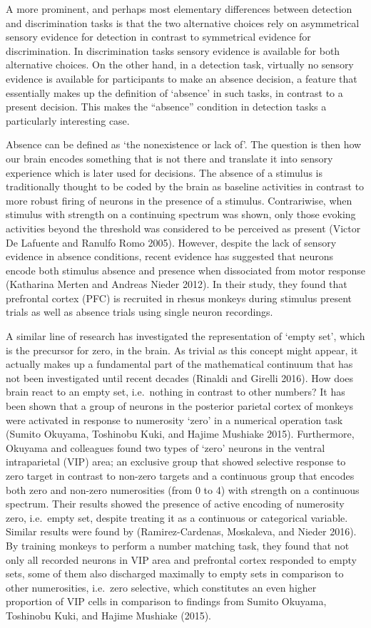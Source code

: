 \documentclass[
]{article}
\begin{document}
A more prominent, and perhaps most elementary differences between
detection and discrimination tasks is that the two alternative choices
rely on asymmetrical sensory evidence for detection in contrast to
symmetrical evidence for discrimination. In discrimination tasks sensory
evidence is available for both alternative choices. On the other hand,
in a detection task, virtually no sensory evidence is available for
participants to make an absence decision, a feature that essentially
makes up the definition of `absence' in such tasks, in contrast to a
present decision. This makes the ``absence'' condition in detection
tasks a particularly interesting case.

Absence can be defined as `the nonexistence or lack of'. The question is
then how our brain encodes something that is not there and translate it
into sensory experience which is later used for decisions. The absence
of a stimulus is traditionally thought to be coded by the brain as
baseline activities in contrast to more robust firing of neurons in the
presence of a stimulus. Contrariwise, when stimulus with strength on a
continuing spectrum was shown, only those evoking activities beyond the
threshold was considered to be perceived as present (Victor De Lafuente
and Ranulfo Romo 2005). However, despite the lack of sensory evidence in
absence conditions, recent evidence has suggested that neurons encode
both stimulus absence and presence when dissociated from motor response
(Katharina Merten and Andreas Nieder 2012). In their study, they found
that prefrontal cortex (PFC) is recruited in rhesus monkeys during
stimulus present trials as well as absence trials using single neuron
recordings.

A similar line of research has investigated the representation of `empty
set', which is the precursor for zero, in the brain. As trivial as this
concept might appear, it actually makes up a fundamental part of the
mathematical continuum that has not been investigated until recent
decades (Rinaldi and Girelli 2016). How does brain react to an empty
set, i.e.~nothing in contrast to other numbers? It has been shown that a
group of neurons in the posterior parietal cortex of monkeys were
activated in response to numerosity `zero' in a numerical operation task
(Sumito Okuyama, Toshinobu Kuki, and Hajime Mushiake 2015). Furthermore,
Okuyama and colleagues found two types of `zero' neurons in the ventral
intraparietal (VIP) area; an exclusive group that showed selective
response to zero target in contrast to non-zero targets and a continuous
group that encodes both zero and non-zero numerosities (from 0 to 4)
with strength on a continuous spectrum. Their results showed the
presence of active encoding of numerosity zero, i.e.~empty set, despite
treating it as a continuous or categorical variable. Similar results
were found by (Ramirez-Cardenas, Moskaleva, and Nieder 2016). By
training monkeys to perform a number matching task, they found that not
only all recorded neurons in VIP area and prefrontal cortex responded to
empty sets, some of them also discharged maximally to empty sets in
comparison to other numerosities, i.e.~zero selective, which constitutes
an even higher proportion of VIP cells in comparison to findings from
Sumito Okuyama, Toshinobu Kuki, and Hajime Mushiake (2015).
\end{document}
